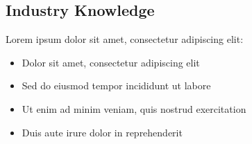 \subsection{Industry Knowledge}

Lorem ipsum dolor sit amet, consectetur adipiscing elit:

\begin{itemize}
    \item \textbf{} Dolor sit amet, consectetur adipiscing elit
    \item \textbf{} Sed do eiusmod tempor incididunt ut labore
    \item \textbf{} Ut enim ad minim veniam, quis nostrud exercitation
    \item \textbf{} Duis aute irure dolor in reprehenderit
\end{itemize}
